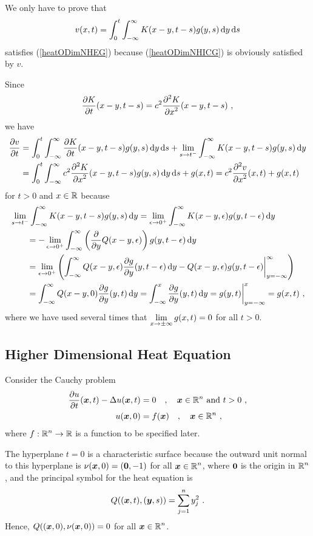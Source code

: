 We only have to prove that
\[
v(x,t) = \int_0^t \int_{-\infty}^{\infty} K(x-y,t-s) g(y,s) \dx{y}\dx{s}
\]
satisfies (\ref{heatODimNHEG}) because (\ref{heatODimNHICG}) is
obviously satisfied by $v$.

Since
\[
\pdydx{K}{t}(x-y,t-s) = c^2 \pdydxn{K}{x}{2}(x-y,t-s) \ ,
\]
we have
\begin{align*}
\pdydx{v}{t} &= \int_0^t \int_{-\infty}^{\infty}
\pdydx{K}{t}(x-y, t-s) g(y,s) \dx{y}\dx{s} 
+ \lim_{s\to t^-} \int_{-\infty}^{\infty} K(x-y,t-s)g(y,s) \dx{y} \\
& = \int_0^t \int_{-\infty}^{\infty} c^2
\pdydxn{K}{x}{2}(x-y, t-s) g(y,s) \dx{y}\dx{s} + g(x,t)
= c^2 \pdydxn{v}{x}{2}(x,t) + g(x,t)
\end{align*}
for $t>0$ and $x\in \RR$ because
\begin{align*}
& \lim_{s\to t^-} \int_{-\infty}^{\infty} K(x-y,t-s)g(y,s) \dx{y}
= \lim_{\epsilon \to 0^+} \int_{-\infty}^{\infty}
K(x-y,\epsilon)g(y,t-\epsilon) \dx{y} \\
& \qquad = -\lim_{\epsilon \to 0^+} \int_{-\infty}^{\infty}
\left(\pdfdx{Q(x-y,\epsilon)}{y}\right) g(y,t-\epsilon) \dx{y} \\
& \qquad = \lim_{\epsilon \to 0^+} \left( \int_{-\infty}^{\infty} Q(x-y,\epsilon)
\pdydx{g}{y}(y,t-\epsilon) \dx{y}
- Q(x-y,\epsilon) g(y,t-\epsilon) \bigg|_{y=-\infty}^{\infty} \right) \\
& \qquad = \int_{-\infty}^{\infty} Q(x-y,0) \pdydx{g}{y}(y,t) \dx{y}
= \int_{-\infty}^x \pdydx{g}{y}(y,t) \dx{y}
= g(y,t) \bigg|_{y=-\infty}^x = g(x,t) \ ,
\end{align*}
where we have used several times that
$\DS \lim_{x\to \pm\infty} g(x,t) = 0$ for all $t>0$.

\subsection{Higher Dimensional Heat Equation}

Consider the Cauchy problem
\begin{align}
\pdydx{u}{t}(\VEC{x},t) - \Delta u(\VEC{x},t) &= 0 \quad , \quad
\VEC{x} \in \RR^n \ \text{and} \ t> 0 \ , \label{heat_cauchyA} \\
u(\VEC{x},0) &= f(\VEC{x}) \quad , \quad \VEC{x} \in \RR^n \ ,
\label{heat_cauchyB} 
\end{align}
where $\DS f:\RR^n\rightarrow \RR$ is a function to be
specified later.

\begin{rmk}
The hyperplane $t=0$ is a characteristic surface because the outward
unit normal to this hyperplane is $\nu(\VEC{x},0) = (\VEC{0},-1)$ for
all $\DS \VEC{x} \in \RR^n$, where $\VEC{0}$ is the origin
in $\DS \RR^n$, and the principal symbol for the heat equation is
\[
Q((\VEC{x},t), (\VEC{y},s)) = \sum_{j=1}^n y_j^2 \ .
\]
Hence, $\DS Q((\VEC{x},0), \nu(\VEC{x},0)) = 0$ for
all $\DS \VEC{x} \in \RR^n$.
\end{rmk}

